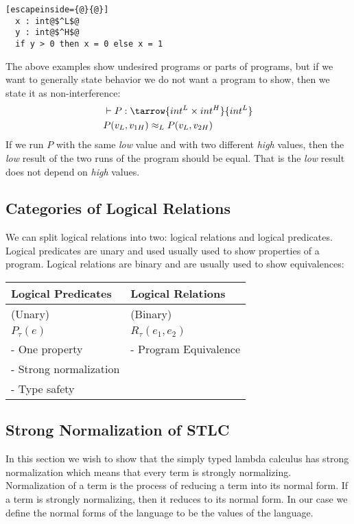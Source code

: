 \begin{itemize}
\begin{itemize}
        \begin{lstlisting}[escapeinside={@}{@}]
  x : int@$^L$@
  y : int@$^H$@
  if y > 0 then x = 0 else x = 1
        \end{lstlisting}
The above examples show undesired programs or parts of programs, but if we want to generally state behavior we do not want a program to show, then we state it as non-interference:
\begin{align*}
  & \vdash P : \tarrow{int^L \times int^H}{int^L} \\
  & P(v_L,v_{1H}) \approx_L P(v_L,v_{2H})
\end{align*}
If we run $P$ with the same \emph{low} value and with two different \emph{high} values, then the \emph{low} result of the two runs of the program should be equal. That is the \emph{low} result does not depend on \emph{high} values.
  \end{itemize}
\end{itemize}
\subsection*{Categories of Logical Relations}
We can split logical relations into two: logical relations and logical predicates. Logical predicates are unary and used usually used to show properties of a program. Logical relations are binary and are usually used to show equivalences:\\
\begin{tabular}{l | l}
  Logical Predicates     & Logical Relations    \\
\hline
  (Unary)                & (Binary)             \\
  $P_\tau(e)$             & $R_\tau(e_1,e_2)$     \\
  - One property         & - Program Equivalence\\ %
  - Strong normalization & \\
  - Type safety          & \\
\end{tabular}
\subsection*{Strong Normalization of STLC}
In this section we wish to show that the simply typed lambda calculus
has strong normalization which means that every term is strongly
normalizing. Normalization of a term is the process of reducing a term into its normal form. If a term is strongly normalizing, then it reduces to its normal form. In our case we define the normal forms of the language to be the values of the language.
